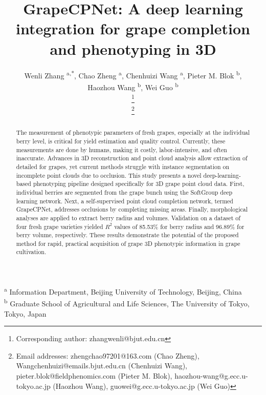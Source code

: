 \documentclass[12pt]{article}
\newcommand\blfootnote[1]{
    \begingroup
    \renewcommand\thefootnote{}\footnote{#1}
    \addtocounter{footnote}{-1}
    \endgroup
}
\begin{document}
\title{GrapeCPNet: A deep learning integration for grape completion and phenotyping in 3D}
\author{
    Wenli Zhang \textsuperscript{a,*},
    Chao Zheng \textsuperscript{a},
    Chenhuizi Wang \textsuperscript{a},
    Pieter M. Blok \textsuperscript{b}, \\
    Haozhou Wang \textsuperscript{b},
    Wei Guo \textsuperscript{b}
    \blfootnote{Corresponding author: zhangwenli@bjut.edu.cn}
    \blfootnote{Email addresses: zhengchao97201@163.com (Chao Zheng), Wangchenhuizi@emails.bjut.edu.cn (Chenhuizi Wang), pieter.blok@fieldphenomics.com (Pieter M. Blok), haozhou-wang@g.ecc.u-tokyo.ac.jp (Haozhou Wang), guowei@g.ecc.u-tokyo.ac.jp (Wei Guo)}
}
\date{}

\maketitle

\noindent\textsuperscript{a} Information Department, Beijing University of Technology, Beijing, China \\
\textsuperscript{b} Graduate School of Agricultural and Life Sciences, The University of Tokyo, Tokyo, Japan\\

\begin{abstract}
The measurement of phenotypic parameters of fresh grapes, especially at the individual berry level, is critical for yield estimation and quality control. 
Currently, these measurements are done by humans, making it costly, labor-intensive, and often inaccurate. 
Advances in 3D reconstruction and point cloud analysis allow extraction of detailed for grapes, yet current methods struggle with instance segmentation on incomplete point clouds due to occlusion. 
This study presents a novel deep-learning-based phenotyping pipeline designed specifically for 3D grape point cloud data.                                                         
First, individual berries are segmented from the grape bunch using the SoftGroup deep learning network. 
Next, a self-supervised point cloud completion network, termed GrapeCPNet, addresses occlusions by completing missing areas.  
Finally, morphological analyses are applied to extract berry radius and volumes. 
Validation on a dataset of four fresh grape varieties yielded  $R^2$ values of 85.53\% for berry radius and 96.89\% for berry volume, respectively. 
These results demonstrate the potential of the proposed method for rapid, practical acquisition of grape 3D phenotypic information in grape cultivation.
\end{abstract}
\end{document}
